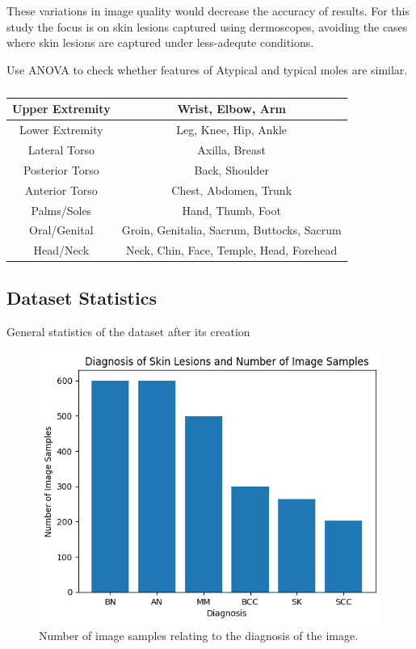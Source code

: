 These variations in image quality would decrease the accuracy of results. For this study the focus is on skin lesions captured using dermoscopes, avoiding the cases where skin lesions are captured under less-adequte conditions.

Use ANOVA to check whether features of Atypical and typical moles are similar.


\begin{table}
	\small
	\begin{tabular}{|c|c|}
		\hline
		Upper Extremity & Wrist, Elbow, Arm
		\\
		\hline
		Lower Extremity & Leg, Knee, Hip, Ankle
		\\
		\hline
		Lateral Torso & Axilla, Breast
		\\
		\hline
		Posterior Torso & Back, Shoulder
		\\
		\hline
		Anterior Torso & Chest, Abdomen, Trunk
		\\
		\hline
		Palms/Soles & Hand, Thumb, Foot
		\\
		\hline
		Oral/Genital & Groin, Genitalia, Sacrum, Buttocks, Sacrum
		\\
		\hline
		Head/Neck & Neck, Chin, Face, Temple, Head, Forehead
		\\
		\hline
	\end{tabular}
	\caption{}
\end{table} \label{nhs-location-names}



\subsection{Dataset Statistics}
General statistics of the dataset after its creation

\begin{figure}
	\centering
	\includegraphics[scale=0.8]{images/nhs/nhs-diagnosis.png}
	\caption{Number of image samples relating to the diagnosis of the image.} 
\end{figure} \label{nhs-diagnosis}


